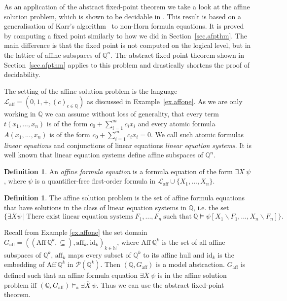 \documentclass[acmsmall]{acmart}
\theoremstyle{plain}
\theoremstyle{definition}
\newtheorem{definition}[theorem]{Definition}
\newcommand{\calL}{\mathcal{L}}
\newcommand{\mybar}[1]{\overline{#1}}
\newcommand{\Nat}{\mathbb{N}}
\newcommand{\Rat}{\mathbb{Q}}
\newcommand{\id}{{\mathrm{id}}}
\newcommand{\powset}{\mathcal{P}}
\newcommand{\Laff}{\calL_{\mathrm{aff}}}
\newcommand{\Aff}{{\mathrm{Aff}~}}
\newcommand{\aff}{{\mathrm{aff}}}
\newcommand{\modelsa}{\models_\mathrm{a}} %
\begin{document}
As an application of the abstract fixed-point theorem we take a look at the affine
 solution problem, which is shown to be decidable in \cite{Hetzl20Decidability}.
This result is based on a generalisation of Karr's algorithm~\cite{Karr76Affine}
 to non-Horn formula equations.
It is proved by computing a fixed point similarly to how we did in Section~\ref{sec.afpthm}.
The main difference is that the fixed point is not computed on the logical level, but in
 the lattice of affine subspaces of $\Rat^n$.
The abstract fixed point theorem shown in Section~\ref{sec.afpthm} applies to this problem
 and drastically shortens the proof of decidability.

The setting of the affine solution problem is the language $\Laff = (0,1,+,(c)_{c \in \Rat})$
 as discussed in Example~\ref{ex.affone}.
As we are only working in $\Rat$ we can assume without loss of generality, that every term $t(x_1,...,x_n)$ is of the form $c_0 + \sum_{i=1}^m c_i x_i$ and every atomic formula $A(x_1,...,x_n)$ is of the form $c_0 + \sum_{i=1}^m c_i x_i = 0$. We call such atomic formulas \emph{linear equations} and conjunctions of linear equations \emph{linear equation systems}.
It is well known that linear equation systems define affine subspaces of $\Rat^n$.

\begin{definition}
	An \emph{affine formula equation} is a formula equation of the form $\exists \mybar{X} ~\psi$, where $\psi$ is a quantifier-free first-order formula in $\Laff\cup \{X_1,...,X_n\}$. 
\end{definition}

\begin{definition}
	The affine solution problem is the set of affine formula equations that have solutions in the class of linear equation systems in $\Rat$, i.e. the set 
	\[
	\{\exists \mybar{X} \psi ~|~ \text{There exist linear equation systems}~ F_1,...,F_n ~\text{such that}~ \Rat \models \psi[X_1\backslash F_1,...,X_n\backslash F_n]\}.
	\]
\end{definition}

Recall from Example \ref{ex.affone} the set domain  $G_{\aff} = ((\Aff \Rat^k,\subseteq),\aff_k,\id_k)_{k \in \Nat}$, where $\Aff \Rat^k$ is the set of all affine subspaces of $\Rat^k$, $\aff_k$ maps every subset of $\Rat^k$ to its affine hull and $\id_k$ is the embedding of $\Aff \Rat^k$ in $\powset(\Rat^k)$. Then $(\Rat, G_{\aff})$ is a model abstraction. $G_{\aff}$ is defined such that an affine formula equation $\exists \mybar{X} ~\psi$ is in the affine solution problem iff $(\Rat,G_{\aff}) \modelsa \exists \mybar{X} ~\psi$. Thus we can use the abstract fixed-point theorem.
\end{document}

